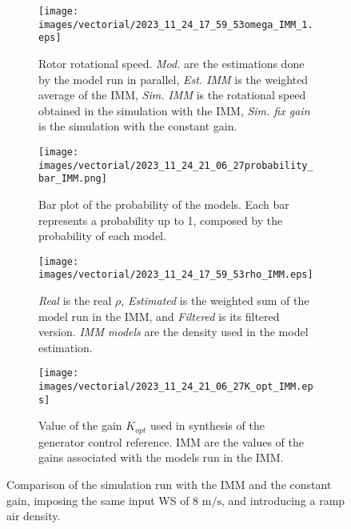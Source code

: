 \begin{figure}[!htbp]
  \begin{subfigure}{0.49\columnwidth}
    \centering
    \texttt{[image: images/vectorial/2023\_11\_24\_17\_59\_53omega\_IMM\_1.eps]}
    \caption{Rotor rotational speed. \textit{Mod.} are the estimations done by the model run in parallel, \textit{Est. IMM} is the weighted average of the IMM, \textit{Sim. IMM} is the rotational speed obtained in the simulation with the IMM, \textit{Sim. fix gain} is the simulation with the constant gain.}
    \label{fig:fig_omega_IMM_1}
  \end{subfigure}
  \begin{subfigure}{0.49\columnwidth}
    \centering
    \texttt{[image: images/vectorial/2023\_11\_24\_21\_06\_27probability\_bar\_IMM.png]}
    \caption{Bar plot of the probability of the models. Each bar represents a probability up to 1, composed by the probability of each model.}
    \label{fig:fig_probability_IMM}
  \end{subfigure}
  \begin{subfigure}{0.49\columnwidth}
    \centering
    \texttt{[image: images/vectorial/2023\_11\_24\_17\_59\_53rho\_IMM.eps]}
    \caption{\textit{Real} is the real $\rho$, \textit{Estimated} is the weighted sum of the model run in the IMM, and \textit{Filtered} is its filtered version. \textit{IMM models} are the density used in the model estimation.}
    \label{fig:fig_rho_IMM}
  \end{subfigure}
  \begin{subfigure}{0.49\columnwidth}
    \centering
    \texttt{[image: images/vectorial/2023\_11\_24\_21\_06\_27K\_opt\_IMM.eps]}
    \caption{Value of the gain $K_{opt}$ used in synthesis of the generator control reference. IMM are the values of the gains associated with the models run in the IMM.}
    \label{fig:fig_K_IMM}
  \end{subfigure}
  \caption{Comparison of the simulation run with the IMM and the constant gain, imposing the same input WS of 8 $\si{\meter\per\second}$, and introducing a ramp air density.}
  \label{fig:fig_IMM_sim_const_WS}
\end{figure}

